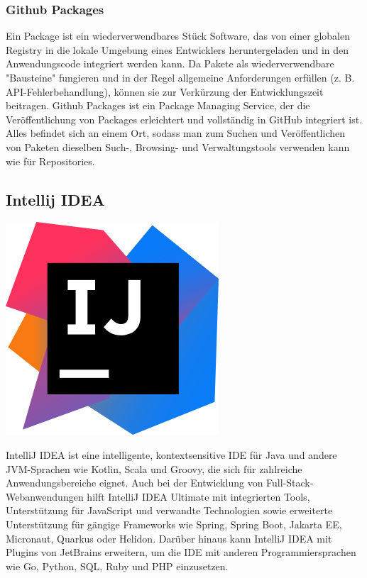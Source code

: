 \subsubsection{Github Packages}

Ein Package ist ein wiederverwendbares Stück Software, das von einer globalen Registry in die lokale Umgebung eines Entwicklers heruntergeladen und 
in den Anwendungscode integriert werden kann. Da Pakete als wiederverwendbare "Bausteine" fungieren und in der Regel allgemeine Anforderungen erfüllen 
(z. B. API-Fehlerbehandlung), können sie zur Verkürzung der Entwicklungszeit beitragen. Github Packages ist ein Package Managing Service, 
der die Veröffentlichung von Packages erleichtert und vollständig in GitHub integriert ist. Alles befindet sich an einem Ort, 
sodass man zum Suchen und Veröffentlichen von Paketen dieselben Such-, Browsing- und Verwaltungstools verwenden kann wie für Repositories.
\cite{sysarch-github-5}

\subsection{Intellij IDEA}
\includegraphics[scale=0.05]{pics/intellijIdeaLogo.png}

IntelliJ IDEA ist eine intelligente, kontextsensitive IDE für Java und andere JVM-Sprachen wie Kotlin, Scala und Groovy, die sich für zahlreiche 
Anwendungsbereiche eignet. Auch bei der Entwicklung von Full-Stack-Webanwendungen hilft IntelliJ IDEA Ultimate mit integrierten Tools, 
Unterstützung für JavaScript und verwandte Technologien sowie erweiterte Unterstützung für gängige Frameworks wie Spring, Spring Boot, Jakarta EE, Micronaut, 
Quarkus oder Helidon. Darüber hinaus kann IntelliJ IDEA mit Plugins von JetBrains erweitern, um die IDE mit anderen Programmiersprachen wie 
Go, Python, SQL, Ruby und PHP einzusetzen. 
\cite{sysarch-intellij-1}

